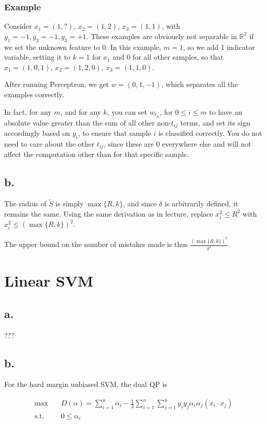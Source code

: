 \documentclass[]{article}
\begin{document}
\subsubsection{Example}
Consider $x_1 = (1,?)$, $x_2 = (1,2)$, $x_3 = (1,1)$, with $y_1 = -1, y_2 = -1, y_3 = +1$. These examples are obviously not separable in $\mathbb{R}^2$ if we set the unknown feature to 0. In this example, $m=1$, so we add 1 indicator variable, setting it to $k=1$ for $x_1$ and $0$ for all other samples, so that $x_1 = (1,0,1)$, $x_2 = (1,2,0)$, $x_3 = (1,1,0)$.

After running Perceptron, we get $w = (0,1,-1)$, which separates all the examples correctly.

In fact, for any $m$, and for any $k$, you can set $w_{t_{ii}}$, for $0 \le i \le m$ to have an absolute value greater than the sum of all other non-$t_{ij}$ terms, and set its sign accordingly based on $y_i$, to ensure that sample $i$ is classified correctly. You do not need to care about the other $t_{ij}$, since these are 0 everywhere else and will not affect the computation other than for that specific sample.

\subsection{b.}
The radius of $\tilde S$ is simply $\max \{R,k\}$, and since $\delta$ is arbitrarily defined, it remains the same. Using the same derivation as in lecture, replace $x_i^2 \le R^2$ with $x_i^2 \le (\max \{R, k\})^2$.

The upper bound on the number of mistakes made is thus $\frac{(\max \{R,k\})^2}{\delta^2}$.

\section{Linear SVM}

\subsection{a.}
???

\subsection{b.}
For the hard margin unbiased SVM, the dual QP is

\begin{align*}
\max\quad & D(\alpha) = \sum_{i=1}^n \alpha_i - \frac{1}{2} \sum_{i=1}^n \sum_{j=1}^n y_iy_j\alpha_i\alpha_j(x_i \cdot x_j)\\
\text{s.t.}\quad & 0 \le \alpha_i
\end{align*}
\end{document}

